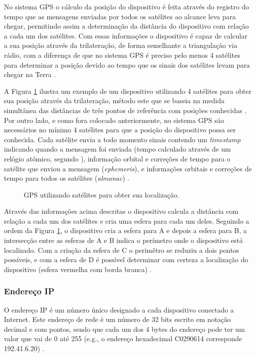 \documentclass[diss]{template/setrem}
\begin{document}
No sistema GPS o cálculo da posição do dispositivo é feita através do registro do tempo que as mensagens enviadas por todos os satélites ao alcance leva para chegar, permitindo assim a determinação da distância do dispositivo com relação a cada um dos satélites. Com essas informações o dispositivo é capaz de calcular a sua posição através da trilateração, de forma semelhante a triangulação via rádio, com a diferença de que no sistema GPS é preciso pelo menos 4 satélites para determinar a posição devido ao tempo que os sinais dos satélites levam para chegar na Terra \citep{Holdener2011}.

A Figura \ref{fig:trilateration} ilustra um exemplo de um dispositivo utilizando 4 satélites para obter sua posição através da trilateração, método este que se baseia na medida simultânea das distâncias de três pontos de referência com posições conhecidas \citep{Manolakis1996}. Por outro lado, e como fora colocado anteriormente, no sistema GPS são necessários no mínimo 4 satélites para que a posição do dispositivo possa ser conhecida. Cada satélite envia a todo momento sinais contendo um \emph{timestamp} indicando quando a mensagem foi enviada (tempo calculado através de um relógio atômico, segundo \citet{Blewitt1997}), informação orbital e correções de tempo para o satélite que enviou a mensagem (\emph{ephemeris}), e informações orbitais e correções de tempo para todos os satélites (\emph{almanac}) \citep{Holdener2011}.

\begin{figure}[!h]
    \caption{GPS utilizando satélites para obter sua localização.}
    \label{fig:trilateration}
\end{figure}

Através das informações acima descritas o dispositivo calcula a distância com relação a cada um dos satélites e cria uma esfera para cada um deles. Seguindo a ordem da Figura \ref{fig:trilateration}, o dispositivo cria a esfera para A e depois a esfera para B, a intersecção entre as esferas de A e B indica o perímetro onde o dispositivo está localizado. Com a criação da esfera de C o perimêtro se reduziu a dois pontos possíveis, e com a esfera de D é possível determinar com certeza a localização do dispositivo (esfera vermelha com borda branca) \citep{Holdener2011}.

\subsubsection{Endereço IP}
\label{subsubsec:endip}
O endereço IP é um número único designado a cada dispositivo conectado a Internet. Este endereço de rede é um número de 32 bits escrito em notação decimal e com pontos, sendo que cada um dos 4 bytes do endereço pode ter um valor que vai de 0 até 255 (e.g., o endereço hexadecimal C0290614 corresponde 192.41.6.20) \citep{Tanenbaum2003}.
\end{document}
